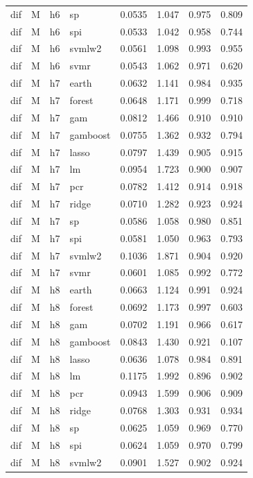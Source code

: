 \begin{ThreePartTable}
\begin{longtable}[t]{llclcccc}
dif & M & h6 & sp & 0.0535 & 1.047 & 0.975 & 0.809\\
dif & M & h6 & spi & 0.0533 & 1.042 & 0.958 & 0.744\\
dif & M & h6 & svmlw2 & 0.0561 & 1.098 & 0.993 & 0.955\\
dif & M & h6 & svmr & 0.0543 & 1.062 & 0.971 & 0.620\\
\addlinespace
dif & M & h7 & earth & 0.0632 & 1.141 & 0.984 & 0.935\\
dif & M & h7 & forest & 0.0648 & 1.171 & 0.999 & 0.718\\
dif & M & h7 & gam & 0.0812 & 1.466 & 0.910 & 0.910\\
dif & M & h7 & gamboost & 0.0755 & 1.362 & 0.932 & 0.794\\
dif & M & h7 & lasso & 0.0797 & 1.439 & 0.905 & 0.915\\
dif & M & h7 & lm & 0.0954 & 1.723 & 0.900 & 0.907\\
dif & M & h7 & pcr & 0.0782 & 1.412 & 0.914 & 0.918\\
dif & M & h7 & ridge & 0.0710 & 1.282 & 0.923 & 0.924\\
dif & M & h7 & sp & 0.0586 & 1.058 & 0.980 & 0.851\\
dif & M & h7 & spi & 0.0581 & 1.050 & 0.963 & 0.793\\
dif & M & h7 & svmlw2 & 0.1036 & 1.871 & 0.904 & 0.920\\
dif & M & h7 & svmr & 0.0601 & 1.085 & 0.992 & 0.772\\
\addlinespace
dif & M & h8 & earth & 0.0663 & 1.124 & 0.991 & 0.924\\
dif & M & h8 & forest & 0.0692 & 1.173 & 0.997 & 0.603\\
dif & M & h8 & gam & 0.0702 & 1.191 & 0.966 & 0.617\\
dif & M & h8 & gamboost & 0.0843 & 1.430 & 0.921 & 0.107\\
dif & M & h8 & lasso & 0.0636 & 1.078 & 0.984 & 0.891\\
dif & M & h8 & lm & 0.1175 & 1.992 & 0.896 & 0.902\\
dif & M & h8 & pcr & 0.0943 & 1.599 & 0.906 & 0.909\\
dif & M & h8 & ridge & 0.0768 & 1.303 & 0.931 & 0.934\\
dif & M & h8 & sp & 0.0625 & 1.059 & 0.969 & 0.770\\
dif & M & h8 & spi & 0.0624 & 1.059 & 0.970 & 0.799\\
dif & M & h8 & svmlw2 & 0.0901 & 1.527 & 0.902 & 0.924\\

\end{longtable}
\end{ThreePartTable}
